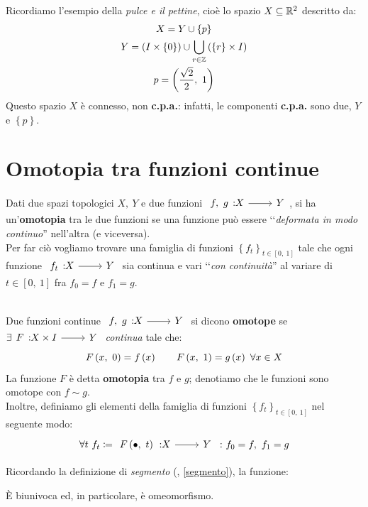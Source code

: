 \begin{example}
	Ricordiamo l'esempio della \textit{pulce e il pettine}, cioè lo spazio $X\subseteq \mathbb{R}^2$ descritto da:
	\begin{gather*}
		X=Y\cup \left\{p\right\}\\
		Y=\left(I\times \left\{0\right\}\right)\cup \mathop{{\bigcup}}\displaylimits_{r\in\mathbb{Z}}\left(\left\{r\right\}\times I\right)\\
		p=\left(\frac{\sqrt{2}}{2},\ 1\right)
	\end{gather*}
Questo spazio $X$ è connesso, non \textbf{c.p.a.}: infatti, le componenti \textbf{c.p.a.} sono due, $Y$ e $\left\{p\right\}$.
\end{example}
\section{Omotopia tra funzioni continue}
\begin{intuit}
	Dati due spazi topologici $X,\ Y$ e due funzioni $\funz{f,\ g}{X}{Y}$, si ha un'\textbf{omotopia} tra le due funzioni se una funzione può essere ‘‘\textit{deformata in modo continuo}'' nell'altra (e viceversa).\\
	Per far ciò vogliamo trovare una famiglia di funzioni $\left\{f_t\right\}_{t\in\left[0,\ 1\right]}$ tale che ogni funzione $\funz{f_t}{X}{Y}$ sia continua e vari ‘‘\textit{con continuità}'' al variare di $t\in\left[0,\ 1\right]$ fra $f_0=f$ e $f_1=g$.
\end{intuit}
\begin{define}[Omotopia.]~{}\\
	Due funzioni continue $\funz{f,\ g}{X}{Y}$ si dicono \textbf{omotope} se $\exists \funz{F}{X\times I}{Y}$ \textit{continua} tale che:
	\begin{equation}
		F\left(x,\ 0\right)=f\left(x\right)\qquad F\left(x,\ 1\right)=g\left(x\right)\ \forall x\in X
	\end{equation}
La funzione $F$ è detta \textbf{omotopia} tra $f$ e $g$; denotiamo che le funzioni sono omotope con $f\sim g$.\\
Inoltre, definiamo gli elementi della famiglia di funzioni $\left\{f_t\right\}_{t\in\left[0,\ 1\right]}$ nel  seguente modo:
\begin{equation}
\forall t\ f_t\coloneqq \funz{\mvf{F}{\bullet}{t}}{X}{Y}\ \colon f_0=f,\ f_1=g
\end{equation}
\vspace{-6mm}
\end{define}
\begin{observe}
Ricordando la definizione di \textit{segmento} (\pageref{segmento}, \autoref{segmento}), la funzione:
\begin{center}
\end{center}
È biunivoca ed, in particolare, è omeomorfismo.
\end{observe}
